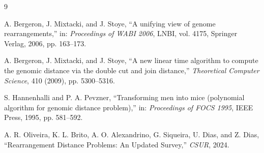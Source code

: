 \documentclass[paper=a4,fontsize=11pt,report,oneside]{jlreq}
\begin{document}
\begin{thebibliography}{9}

    A. Bergeron, J. Mixtacki, and J. Stoye, ``A unifying view of genome rearrangements,'' in: \textit{Proceedings of WABI 2006}, LNBI, vol. 4175, Springer Verlag, 2006, pp. 163--173.

    A. Bergeron, J. Mixtacki, and J. Stoye, ``A new linear time algorithm to compute the genomic distance via the double cut and join distance,'' \textit{Theoretical Computer Science}, 410 (2009), pp. 5300--5316.

    S. Hannenhalli and P. A. Pevzner, ``Transforming men into mice (polynomial algorithm for genomic distance problem),'' in: \textit{Proceedings of FOCS 1995}, IEEE Press, 1995, pp. 581--592.

    A. R. Oliveira, K. L. Brito, A. O. Alexandrino, G. Siqueira, U. Dias, and Z. Dias, ``Rearrangement Distance Problems: An Updated Survey,'' \textit{CSUR}, 2024.

\end{thebibliography}

\appendix


\end{document}
